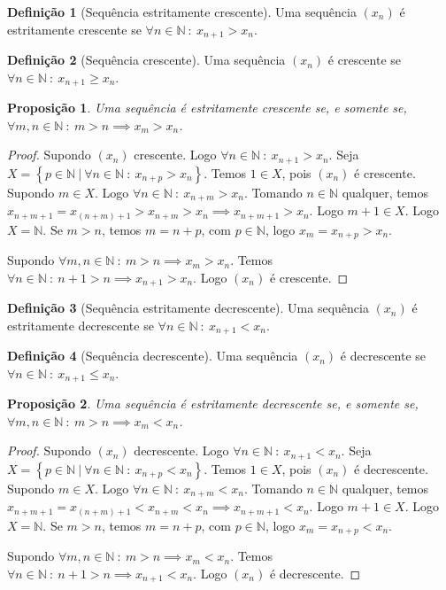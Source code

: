 \documentclass{article}
\theoremstyle{plain}
\newtheorem{prop}{Proposição}[section]
\theoremstyle{definition}
\newtheorem{definicao}{Definição}[section]
\theoremstyle{remark}
\begin{document}
\begin{definicao}[Sequência estritamente crescente]
	Uma sequência $(x_n)$ é estritamente crescente se $\forall n \in \mathbb{N} \: : \: x_{n+1} > x_n$.
\end{definicao}
\begin{definicao}[Sequência crescente]
	Uma sequência $(x_n)$ é crescente se $\forall n \in \mathbb{N} \: : \: x_{n+1} \geq x_n$.
\end{definicao}
\begin{prop}
	Uma sequência é estritamente crescente se, e somente se, $\forall m,n\in \mathbb{N} \: : \: m > n \implies x_m > x_n$.
\end{prop}
\begin{proof}
	Supondo $(x_n)$ crescente. Logo $\forall n \in \mathbb{N} \: : \: x_{n+1} > x_n$. Seja $X = \left\{ p\in \mathbb{N} \: | \:\forall n \in \mathbb{N} \: : \: x_{n+p} > x_n\right\}$. Temos $1\in X$, pois $(x_n)$ é crescente. Supondo $m \in X$. Logo $\forall n \in \mathbb{N} \: : \: x_{n+m} > x_n$. Tomando $n\in \mathbb{N}$ qualquer, temos $x_{n+m+1} = x_{(n+m)+1} > x_{n+m} > x_n \implies x_{n+m+1} > x_n$. Logo $m+1\in X$. Logo $X = \mathbb{N}$. Se $m>n$, temos $m = n+p$, com $p\in \mathbb{N}$, logo $x_{m} = x_{n+p} > x_n$. 

	Supondo $\forall m,n\in \mathbb{N} \: : \: m > n \implies x_m > x_n$. Temos $\forall n \in \mathbb{N} \: : \:  n+1 > n \implies x_{n+1} > x_n$. Logo $(x_n)$ é crescente.
\end{proof}
\begin{definicao}[Sequência estritamente decrescente]
	Uma sequência $(x_n)$ é   estritamente decrescente se $\forall n \in \mathbb{N} \: : \: x_{n+1} < x_n$.
\end{definicao}
\begin{definicao}[Sequência decrescente]
	Uma sequência $(x_n)$ é decrescente se $\forall n \in \mathbb{N} \: : \: x_{n+1} \leq x_n$.
\end{definicao}
\begin{prop}
	Uma sequência é estritamente decrescente se, e somente se, $\forall m,n\in \mathbb{N} \: : \: m > n \implies x_m < x_n$.
\end{prop}
\begin{proof}
	Supondo $(x_n)$ decrescente. Logo $\forall n \in \mathbb{N} \: : \: x_{n+1} < x_n$. Seja $X = \left\{ p\in \mathbb{N} \: | \:\forall n \in \mathbb{N} \: : \: x_{n+p} < x_n\right\}$. Temos $1\in X$, pois $(x_n)$ é decrescente. Supondo $m \in X$. Logo $\forall n \in \mathbb{N} \: : \: x_{n+m} < x_n$. Tomando $n\in \mathbb{N}$ qualquer, temos $x_{n+m+1} = x_{(n+m)+1} < x_{n+m} < x_n \implies x_{n+m+1} < x_n$. Logo $m+1\in X$. Logo $X = \mathbb{N}$. Se $m>n$, temos $m = n+p$, com $p\in \mathbb{N}$, logo $x_{m} = x_{n+p} < x_n$. 

	Supondo $\forall m,n\in \mathbb{N} \: : \: m > n \implies x_m < x_n$. Temos $\forall n \in \mathbb{N} \: : \:  n+1 > n \implies x_{n+1} < x_n$. Logo $(x_n)$ é decrescente.
\end{proof}
\end{document}
